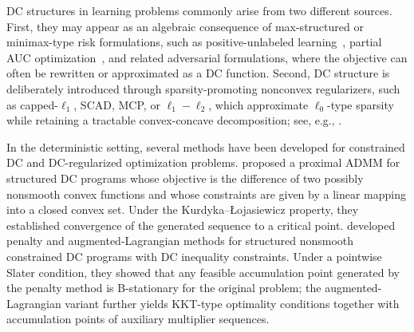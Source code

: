 \documentclass{article}
\theoremstyle{plain}
\theoremstyle{definition}
\theoremstyle{remark}
\numberwithin{equation}{section}
\begin{document}
DC structures in learning problems commonly arise from two different sources. First, they may appear as an algebraic consequence of max-structured or minimax-type risk formulations, such as positive-unlabeled learning~\citep{kiryo2017positive}, partial AUC optimization~\citep{yao2022large}, and related adversarial formulations, where the objective can often be rewritten or approximated as a DC function. Second, DC structure is deliberately introduced through sparsity-promoting nonconvex regularizers, such as capped-\(\ell_1\), SCAD, MCP, or \(\ell_1-\ell_2\), which approximate \(\ell_0\)-type sparsity while retaining a tractable convex-concave decomposition; see, e.g., \citep[Table~1]{gong2013general}.

In the deterministic setting, several methods have been developed for constrained DC and DC-regularized optimization problems. \citet{zhou2024proximal} proposed a proximal ADMM for structured DC programs whose objective is the difference of two possibly nonsmooth convex functions and whose constraints are given by a linear mapping into a closed convex set. Under the Kurdyka--{\L}ojasiewicz property, they established convergence of the generated sequence to a critical point. \citet{lu2022penalty} developed penalty and augmented-Lagrangian methods for structured nonsmooth constrained DC programs with DC inequality constraints. Under a pointwise Slater condition, they showed that any feasible accumulation point generated by the penalty method is B-stationary for the original problem; the augmented-Lagrangian variant further yields KKT-type optimality conditions together with accumulation points of auxiliary multiplier sequences.
\end{document}
